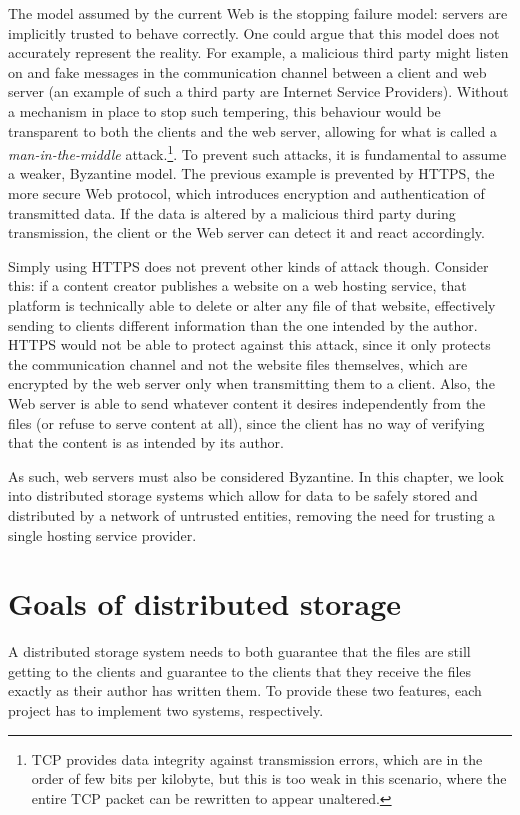 \documentclass[mscthesis]{usiinfthesis}
\begin{document}
The model assumed by the current Web is the stopping failure model: servers are implicitly trusted to behave correctly.
One could argue that this model does not accurately represent the reality.
For example, a malicious third party might listen on and fake messages in the communication channel between a client and web server (an example of such a third party are Internet Service Providers).
Without a mechanism in place to stop such tempering, this behaviour would be transparent to both the clients and the web server, allowing for what is called a \textit{man-in-the-middle} attack.\footnote{TCP provides data integrity against transmission errors, which are in the order of few bits per kilobyte, but this is too weak in this scenario, where the entire TCP packet can be rewritten to appear unaltered.}.
To prevent such attacks, it is fundamental to assume a weaker, Byzantine model.
The previous example is prevented by HTTPS, the more secure Web protocol, which introduces encryption and authentication of transmitted data.
If the data is altered by a malicious third party during transmission, the client or the Web server can detect it and react accordingly.

Simply using HTTPS does not prevent other kinds of attack though. Consider this: if a content creator publishes a website on a web hosting service, that platform is technically able to delete or alter any file of that website, effectively sending to clients different information than the one intended by the author. HTTPS would not be able to protect against this attack, since it only protects the communication channel and not the website files themselves, which are encrypted by the web server only when transmitting them to a client. Also, the Web server is able to send whatever content it desires independently from the files (or refuse to serve content at all), since the client has no way of verifying that the content is as intended by its author.

As such, web servers must also be considered Byzantine.
In this chapter, we look into distributed storage systems which allow for data to be safely stored and distributed by a network of untrusted entities, removing the need for trusting a single hosting service provider.

\section{Goals of distributed storage}

A distributed storage system needs to both guarantee that the files are still getting to the clients and guarantee to the clients that they receive the files exactly as their author has written them. To provide these two features, each project has to implement two systems, respectively.
\end{document}
